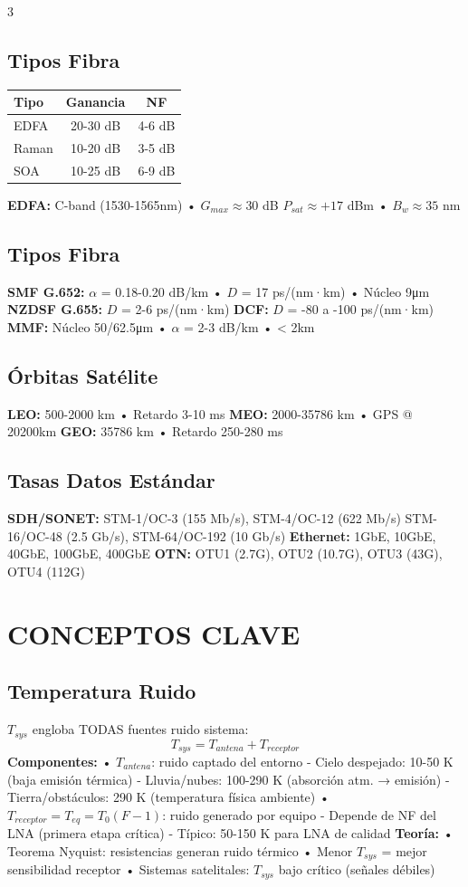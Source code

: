 \documentclass[a4paper,6pt]{extarticle}
\begin{document}
\begin{multicols}{3}
    \subsection*{Tipos Fibra}
    \begin{tabular}{|l|c|c|}
    \hline
    \textbf{Tipo} & \textbf{Ganancia} & \textbf{NF} \\
    \hline
    EDFA & 20-30 dB & 4-6 dB \\
    Raman & 10-20 dB & 3-5 dB \\
    SOA & 10-25 dB & 6-9 dB \\
    \hline
    \end{tabular}
    \textbf{EDFA:} C-band (1530-1565nm) • $G_{max} \approx 30$ dB
    $P_{sat} \approx +17$ dBm • $B_w \approx 35$ nm

    \subsection*{Tipos Fibra}
    \textbf{SMF G.652:} $\alpha$ = 0.18-0.20 dB/km • $D$ = 17 ps/(nm·km) • Núcleo 9μm
    \textbf{NZDSF G.655:} $D$ = 2-6 ps/(nm·km)
    \textbf{DCF:} $D$ = -80 a -100 ps/(nm·km)
    \textbf{MMF:} Núcleo 50/62.5μm • $\alpha$ = 2-3 dB/km • < 2km

    \subsection*{Órbitas Satélite}
    \textbf{LEO:} 500-2000 km • Retardo 3-10 ms
    \textbf{MEO:} 2000-35786 km • GPS @ 20200km
    \textbf{GEO:} 35786 km • Retardo 250-280 ms

    \subsection*{Tasas Datos Estándar}
    \textbf{SDH/SONET:} STM-1/OC-3 (155 Mb/s), STM-4/OC-12 (622 Mb/s)
    STM-16/OC-48 (2.5 Gb/s), STM-64/OC-192 (10 Gb/s)
    \textbf{Ethernet:} 1GbE, 10GbE, 40GbE, 100GbE, 400GbE
    \textbf{OTN:} OTU1 (2.7G), OTU2 (10.7G), OTU3 (43G), OTU4 (112G)

    \section*{CONCEPTOS CLAVE}

\subsection*{Temperatura Ruido}
$T_{sys}$ engloba TODAS fuentes ruido sistema:
$$T_{sys} = T_{antena} + T_{receptor}$$
\textbf{Componentes:}
• $T_{antena}$: ruido captado del entorno
  - Cielo despejado: 10-50 K (baja emisión térmica)
  - Lluvia/nubes: 100-290 K (absorción atm. → emisión)
  - Tierra/obstáculos: 290 K (temperatura física ambiente)
• $T_{receptor} = T_{eq} = T_0(F-1)$: ruido generado por equipo
  - Depende de NF del LNA (primera etapa crítica)
  - Típico: 50-150 K para LNA de calidad
\textbf{Teoría:}
• Teorema Nyquist: resistencias generan ruido térmico
• Menor $T_{sys}$ = mejor sensibilidad receptor
• Sistemas satelitales: $T_{sys}$ bajo crítico (señales débiles)


\end{multicols}
\end{document}
